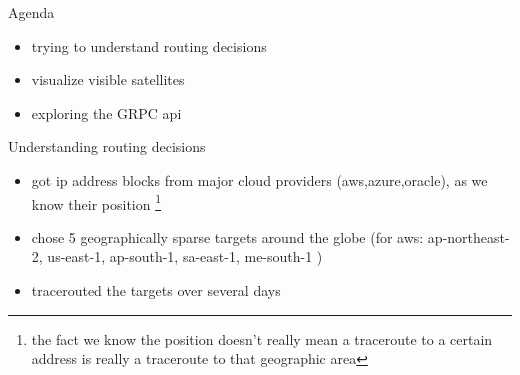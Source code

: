 \documentclass[NET,english,beameralt]{tumbeamer}
\begin{document}
\begin{frame}{Agenda}
    \begin{itemize}
        \item trying to understand routing decisions
        \item visualize visible satellites
        \item exploring the GRPC api
    \end{itemize}
\end{frame}

\begin{frame}{Understanding routing decisions}
    \begin{itemize}
        \item got ip address blocks from major cloud providers (aws,azure,oracle), as we know their position \footnote[]{the fact we know the position doesn't really mean a traceroute to a certain address is really a traceroute to that geographic area}
        \item chose 5 geographically sparse targets around the globe (for aws: ap-northeast-2, us-east-1, ap-south-1, sa-east-1, me-south-1 )
        \item tracerouted the targets over several days 
    \end{itemize}
\end{frame}
\end{document}

